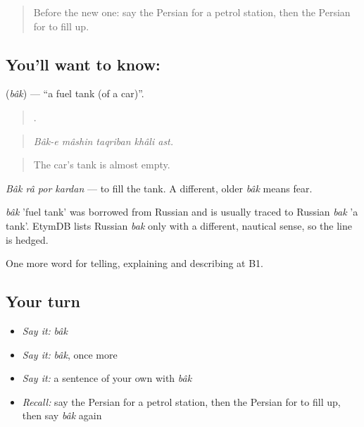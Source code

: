 \label{lesson:FA-C423-bak}



\begin{quote}
Before the new one: say the Persian for a petrol station, then the Persian for to fill up.
\end{quote}

\subsection*{You'll want to know: }
\textbf{} (\emph{bâk}) — \textquotedblleft{}a fuel tank (of a car)\textquotedblright{}.

\begin{quote}
    .
\end{quote}

\begin{quote}
\emph{Bâk-e mâshin taqriban khâli ast.}
\end{quote}

\begin{quote}
The car's tank is almost empty.
\end{quote}

\emph{Bâk râ por kardan} — to fill the tank. A different, older \emph{bâk} means fear.

\begin{cousinweb}
\emph{bâk} 'fuel tank' was borrowed from Russian and is usually traced to Russian \emph{bak} 'a tank'. EtymDB lists Russian \emph{bak} only with a different, nautical sense, so the line is hedged.
\end{cousinweb}

\begin{grammarlens}[title={What you've built}]
One more word for telling, explaining and describing at B1.
\end{grammarlens}

\subsection*{Your turn}
\begin{itemize}
\raggedright
  \item \emph{Say it:} \emph{bâk}
  \item \emph{Say it:} \emph{bâk}, once more
  \item \emph{Say it:} a sentence of your own with \emph{bâk}
  \item \emph{Recall:} say the Persian for a petrol station, then the Persian for to fill up, then say \emph{bâk} again
\end{itemize}

